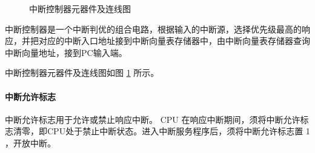 \documentclass{article}
\begin{document}
\def\intControl(#1)#2{
	\begin{scope}[shift={(#1)}]
		\draw (0,0) rectangle (5,2);
		\draw (2.5,2) -- (2.5,0);
		\node at (3.75,1.6) {intWre};
		\node at (3.75,1.0) {intEntryAddr};
		\node at (3.75,0.4) {Hardint};
		\draw (5,1.6) -- +(0.25,0) coordinate (#2 intWre);
		\draw (5,1.0) -- +(0.25,0) coordinate (#2 intEntryAddr);
		\draw (5,0.4) -- +(0.25,0) coordinate (#2 Hardint);
		\draw (0,1.75) node[right] {intSwitch} -- + (-0.25,0) coordinate (#2 intSwitch);
		\draw (0,1.25) node[right] {HardintInput} -- + (-0.25,0) coordinate (#2 HardintInput);
		\draw (0,0.75) node[right] {SoftintInput} -- + (-0.25,0) coordinate (#2 SoftintInput);
		\draw (0,0.25) node[right] {SoftintWre} -- + (-0.25,0) coordinate (#2 SoftintWre);
		\node at (2.5,-0.25) {中断判优逻辑};
	\end{scope}
}

\def\intVectorROM(#1)#2{
	\begin{scope}[shift={(#1)}]
		\draw (0,0) rectangle(5,0.5);
		\draw (2.5,0.5) -- (2.5,0);
		\node at (3.75,0.25) {intVectorAddr};
		\draw (5,0.25) -- +(0.25,0) coordinate (#2 intVectorAddr);
		\draw (0,0.25) node[right] {intEntryAddr} -- + (-0.25,0) coordinate (#2 intEntryAddr);
		\node at (2.5,-0.25) {中断向量表存储器};
	\end{scope}
}

\begin{figure}
\centering

\caption{中断控制器元器件及连线图}
\label{M2}
\end{figure}

中断控制器是一个中断判优的组合电路，根据输入的中断源，选择优先级最高的响应，并把对应的中断入口地址接到中断向量表存储器中，由中断向量表存储器查询中断向量地址，接到PC输入端。

中断控制器元器件及连线图如图 \ref{M2} 所示。

\paragraph{中断允许标志}

中断允许标志用于允许或禁止响应中断。 CPU 在响应中断期间，须将中断允许标志清零，即CPU处于禁止中断状态。进入中断服务程序后，须将中断允许标志置 1 ，开放中断。\cite{COD2}
\end{document}
